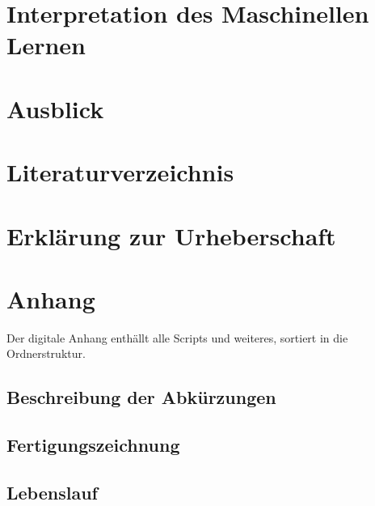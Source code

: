 \documentclass[a4paper,12pt]{article}
\begin{document}
\section{Interpretation des Maschinellen Lernen}


\newpage
\section{Ausblick}


\newpage
%
\section{Literaturverzeichnis}


\newpage
\section{Erklärung zur Urheberschaft}


\newpage
\listoffigures


\listoftables %
\newpage
\section{Anhang}
Der digitale Anhang enthällt alle Scripts und weiteres, sortiert in die Ordnerstruktur.
%
\subsection{Beschreibung der Abkürzungen}

\newpage

\subsection{Fertigungszeichnung}
\label{Fertigungszeichnung}

\newpage


\subsection{Lebenslauf}

\end{document}
